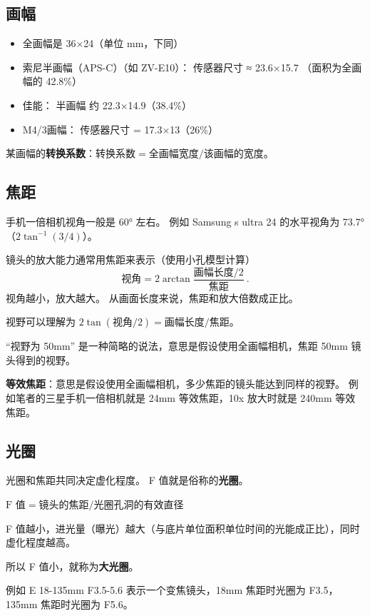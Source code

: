 
\subsection{画幅}
\begin{itemize}
\item 全画幅是 36×24（单位 mm，下同）
\item 索尼半画幅（APS-C）（如 ZV-E10）： 传感器尺寸 ≈ 23.6×15.7 （面积为全画幅的 42.8\%）
\item 佳能： 半画幅 约 22.3×14.9（38.4\%）
\item M4/3画幅： 传感器尺寸 = 17.3×13（26\%）
\end{itemize}

某画幅的\textbf{转换系数}：$\text{转换系数} = \text{全画幅宽度}/\text{该画幅的宽度}$。

\subsection{焦距}
手机一倍相机视角一般是 60° 左右。 例如 Samsung s ultra 24 的水平视角为 73.7°（$2\tan^{-1}(3/4)$）。

镜头的放大能力通常用焦距来表示（使用小孔模型计算）
\begin{equation}
\text{视角} = 2\arctan{\frac{\text{画幅长度/2}}{\text{焦距}}}~.
\end{equation}
视角越小，放大越大。 从画面长度来说，焦距和放大倍数成正比。

视野可以理解为 $2\tan(\text{视角}/2) = \text{画幅长度}/{\text{焦距}}$。

“视野为 50mm” 是一种简略的说法，意思是假设使用全画幅相机，焦距 50mm 镜头得到的视野。

\textbf{等效焦距}：意思是假设使用全画幅相机，多少焦距的镜头能达到同样的视野。 例如笔者的三星手机一倍相机就是 24mm 等效焦距，10x 放大时就是 240mm 等效焦距。


\subsection{光圈}
光圈和焦距共同决定虚化程度。 F 值就是俗称的\textbf{光圈}。

$\text{F 值} = \text{镜头的焦距}/\text{光圈孔洞的有效直径}$

F 值越小，进光量（曝光）越大（与底片单位面积单位时间的光能成正比），同时虚化程度越高。

所以 F 值小，就称为\textbf{大光圈}。

例如 E 18-135mm F3.5-5.6 表示一个变焦镜头，18mm 焦距时光圈为 F3.5， 135mm 焦距时光圈为 F5.6。
